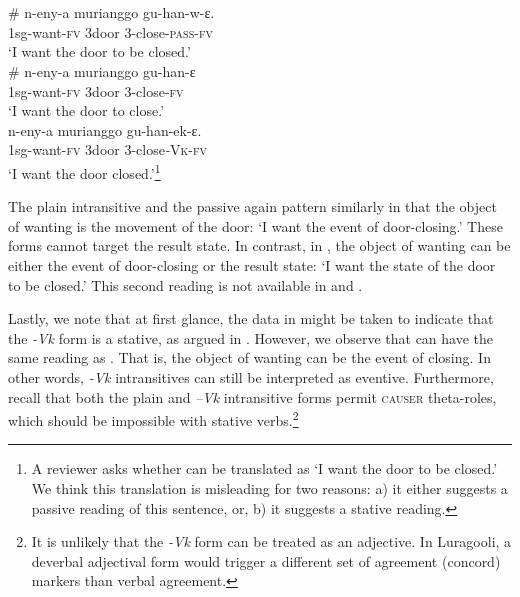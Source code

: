 \documentclass[output=paper]{langsci/langscibook}
\begin{document}
\ea\label{exx:}
{}\\
\ea\label{ex:}
\\
\gll   \# n-eny-a       murianggo gu-han-w-ɛ.\\
     \textit{  }1sg-want-\textsc{fv} 3door         3-close-\textsc{pass}-\textsc{fv}\\
\glt ‘I want the door to be closed.’
\ex
{}\\
\gll \textbf{  }\# n-eny-a       murianggo gu-han-ɛ\\
     \textit{  }1sg-want-\textsc{fv} 3door        3-close-\textsc{fv}\\
\glt ‘I want the door to close.’
\ex
{}\\
\gll \textbf{  }n-eny-a         murianggo gu-han-ek-ɛ.\\
     \textit{  }1sg-want-\textsc{fv} 3door        3-close\textit{-}\textsc{Vk}-\textsc{fv}\\
\glt ‘I want the door closed.’\footnote{ A reviewer asks whether  can be translated as ‘I want the door to be closed.’ We think this translation is misleading for two reasons: a) it either suggests a passive reading of this sentence, or, b) it suggests a stative reading.}
\z
\z

The plain intransitive and the passive again pattern similarly in that the object of wanting is the movement of the door: ‘I want the event of door-closing.’ These forms cannot target the result state. In contrast, in , the object of wanting can be either the event of door-closing or the result state: ‘I want the state of the door to be closed.’ This second reading is not available in  and .

Lastly, we note that at first glance, the data in  might be taken to indicate that the \textit{-Vk} form is a stative, as argued in \citet{DubinskySimango1996}. However, we observe that  can have the same reading as . That is, the object of wanting can be the event of closing. In other words, \textit{-Vk} intransitives can still be interpreted as eventive. Furthermore, recall that both the plain and \textit{–Vk }intransitive forms permit \textsc{causer} theta-roles, which should be impossible with stative verbs.\footnote{It is unlikely that the \textit{-Vk} form can be treated as an adjective. In Luragooli, a deverbal adjectival form would trigger a different set of agreement (concord) markers than verbal agreement.}
\end{document}
